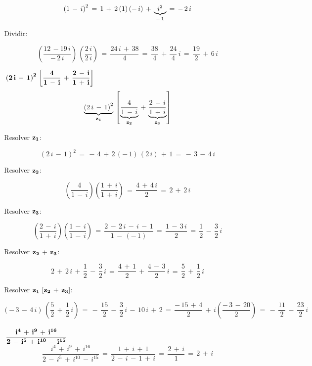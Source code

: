 \documentclass[a4paper,11pt,openany]{book}
\begin{document}
$$\left(1\,-\,i\right)^{2}\,=\,1\,+\,2\,(1)\,(-\,i)\,+\,\underbrace{i^{2}}_{\bf{-\,1}}\,=\,-\,2\,i$$

\textcolor{ao(english)}{}\,Dividir:

$$\left(\dfrac{12\,-19\,i}{-\,2\,i}\right)\,\left(\dfrac{2\,i}{2\,i}\right)\,=\,\dfrac{24\,i\,+\,38}{4}\,=\,\dfrac{38}{4}\,+\,\dfrac{24}{4}\,i\,=\,\dfrac{19}{2}\,+\,6\,i$$

\textcolor{ao(english)}{}\,\quad\,$\bf{\left(2\,i\,-\,1\right)^{2}\,\left[\dfrac{4}{1\,-\,i}\,+\,\dfrac{2\,-\,i}{1\,+\,i}\right]}$\\

$$\underbrace{\left(2\,i\,-\,1\right)^{2}}_{\bf{z_{1}}}\,\left[\underbrace{\dfrac{4}{1\,-\,i}}_{\bf{z_{2}}}\,+\,\underbrace{\dfrac{2\,-\,i}{1\,+\,i}}_{\bf{z_{3}}}\right]$$

\textcolor{ao(english)}{}\,Resolver $\bf{z_{1}}$:

$$\left(2\,i\,-\,1\right)^{2}\,=\,-\,4\,+\,2\,(-\,1)\,(2\,i)\,+\,1\,=\,-\,3\,-\,4\,i$$

\textcolor{ao(english)}{}\,Resolver $\bf{z_{2}}$:

$$\left(\dfrac{4}{1\,-\,i}\right)\left(\dfrac{1\,+\,i}{1\,+\,i}\right)\,=\,\dfrac{4\,+\,4\,i}{2}\,=\,2\,+\,2\,i$$

\textcolor{ao(english)}{}\,Resolver $\bf{z_{3}}$:

$$\left(\dfrac{2\,-\,i}{1\,+\,i}\right)\left(\dfrac{1\,-\,i}{1\,-\,i}\right)\,=\,\dfrac{2\,-\,2\,i\,-\,i\,-\,1}{1\,-\,(-\,1)}\,=\,\dfrac{1\,-\,3\,i}{2}\,=\,\dfrac{1}{2}\,-\,\dfrac{3}{2}\,i$$

\textcolor{ao(english)}{}\,Resolver $\bf{z_{2}\,+\,z_{3}}$:

$$2\,+\,2\,i\,+\,\dfrac{1}{2}\,-\,\dfrac{3}{2}\,i\,=\,\dfrac{4\,+\,1}{2}\,+\,\dfrac{4\,-\,3}{2}\,i\,=\,\dfrac{5}{2}\,+\,\dfrac{1}{2}\,i$$


\textcolor{ao(english)}{}\,Resolver $\bf{z_{1}\,\left[z_{2}\,+\,z_{3}\right]}$:

$$\left(-\,3\,-\,4\,i\right)\,\left(\dfrac{5}{2}\,+\,\dfrac{1}{2}\,i\right)\,=\,-\,\dfrac{15}{2}\,-\,\dfrac{3}{2}\,i\,-\,10\,i\,+\,2\,=\,\dfrac{-\,15\,+\,4}{2}\,+\,i\left(\dfrac{-\,3\,-\,20}{2}\right)\,=\,-\,\dfrac{11}{2}\,-\,\dfrac{23}{2}\,i$$\\

\textcolor{ao(english)}{}\,\quad\,$\bf{\dfrac{i^{4}\,+\,i^{9}\,+\,i^{16}}{2\,-\,i^{5}\,+\,i^{10}\,-\,i^{15}}}$\\

$$\dfrac{i^{4}\,+\,i^{9}\,+\,i^{16}}{2\,-\,i^{5}\,+\,i^{10}\,-\,i^{15}}\,=\,\dfrac{1\,+\,i\,+\,1}{2\,-\,i\,-\,1\,+\,i}\,=\,\dfrac{2\,+\,i}{1}\,=\,2\,+\,i$$
\end{document}
